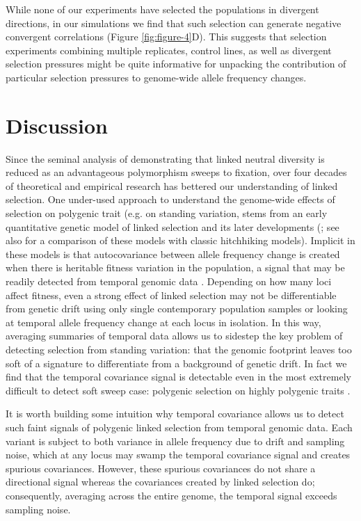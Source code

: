 \documentclass[11pt]{article}
\begin{document}
While none of our experiments have selected the populations in divergent
directions, in our simulations we find that such selection can generate
negative convergent correlations (Figure \ref{fig:figure-4}D). This suggests
that selection experiments combining multiple replicates, control lines, as
well as divergent selection pressures might be quite informative for unpacking
the contribution of particular selection pressures to genome-wide allele
frequency changes.

\section{Discussion}

Since the seminal analysis of \textcite{Maynard_Smith1974-zr} demonstrating
that linked neutral diversity is reduced as an advantageous polymorphism sweeps
to fixation, over four decades of theoretical and empirical research has
bettered our understanding of linked selection.  One under-used approach to
understand the genome-wide effects of selection on polygenic trait (e.g.  on
standing variation, stems from an early quantitative genetic model of linked
selection \parencite{Robertson1961-ho} and its later developments
(\cite{Santiago1995-hx,Santiago1998-bs,Wray1990-zf,Woolliams1993-qo}; see also
\cite{Barton2000-zg} for a comparison of these models with classic hitchhiking
models). Implicit in these models is that autocovariance between allele
frequency change is created when there is heritable fitness variation in the
population, a signal that may be readily detected from temporal genomic data
\parencite{Buffalo2019-io}.  Depending on how many loci affect fitness, even a
strong effect of linked selection may not be differentiable from genetic drift
using only single contemporary population samples or looking at temporal allele
frequency change at each locus in isolation. In this way, averaging summaries
of temporal data allows us to sidestep the key problem of detecting selection
from standing variation: that the genomic footprint leaves too soft of a
signature to differentiate from a background of genetic drift. In fact we find
that the temporal covariance signal is detectable even in the most extremely
difficult to detect soft sweep case: polygenic selection on highly polygenic
traits \parencite{Buffalo2019-io}.

It is worth building some intuition why temporal covariance allows us to detect
such faint signals of polygenic linked selection from temporal genomic data.
Each variant is subject to both variance in allele frequency due to drift and
sampling noise, which at any locus may swamp the temporal covariance signal and
creates spurious covariances. However, these spurious covariances do not share
a directional signal whereas the covariances created by linked selection do;
consequently, averaging across the entire genome, the temporal signal exceeds
sampling noise. 
\end{document}

